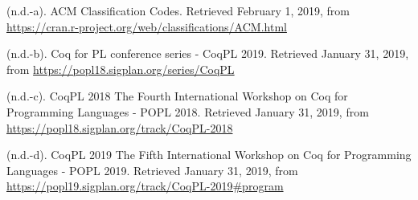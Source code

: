\documentclass[12pt,twoside]{article}
\begin{document}
{\begin{thebibliography}{222}
\mdbibitemlabel{[n.d.-a]}(n.d.-a). ACM Classification Codes. Retrieved February 1, 2019, from \href{https://cran.r-project.org/web/classifications/ACM.html}{{\ttfamily https://\hspace{0pt}cran.\hspace{0pt}r-\hspace{0pt}project.\hspace{0pt}org/\hspace{0pt}web/\hspace{0pt}classifications/\hspace{0pt}ACM.\hspace{0pt}html}}\label{acm_acm_nodate}%

\mdbibitemlabel{[n.d.-b]}(n.d.-b). Coq for PL conference series - CoqPL 2019. Retrieved January 31, 2019, from \href{https://popl18.sigplan.org/series/CoqPL}{{\ttfamily https://\hspace{0pt}popl18.\hspace{0pt}sigplan.\hspace{0pt}org/\hspace{0pt}series/\hspace{0pt}CoqPL}}\label{acm_coq_nodate}%

\mdbibitemlabel{[n.d.-c]}(n.d.-c). CoqPL 2018 The Fourth International Workshop on Coq for Programming Languages - POPL 2018. Retrieved January 31, 2019, from \href{https://popl18.sigplan.org/track/CoqPL-2018}{{\ttfamily https://\hspace{0pt}popl18.\hspace{0pt}sigplan.\hspace{0pt}org/\hspace{0pt}track/\hspace{0pt}CoqPL-\hspace{0pt}2018}}\label{acm_coqpl_nodate-1}%

\mdbibitemlabel{[n.d.-d]}(n.d.-d). CoqPL 2019 The Fifth International Workshop on Coq for Programming Languages - POPL 2019. Retrieved January 31, 2019, from \href{https://popl19.sigplan.org/track/CoqPL-2019\%23program}{{\ttfamily https://\hspace{0pt}popl19.\hspace{0pt}sigplan.\hspace{0pt}org/\hspace{0pt}track/\hspace{0pt}CoqPL-\hspace{0pt}2019\#\hspace{0pt}program}}\label{acm_coqpl_nodate}%


\end{thebibliography}}
\end{document}

